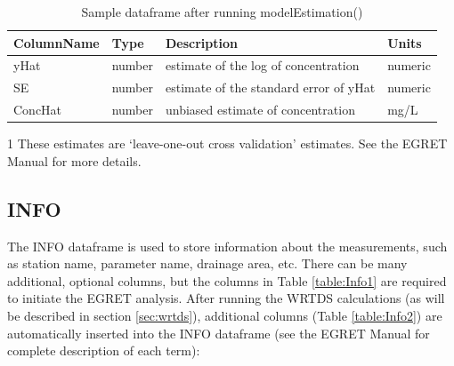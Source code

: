 \documentclass[a4paper,11pt]{article}\usepackage[]{graphicx}\usepackage[]{color}
\begin{document}
\begin{table}[!ht]
\centering
\begin{threeparttable}[b]
\caption{Sample dataframe after running modelEstimation()} 
\label{table:Sample2}
\begin{tabular}{llll}
  \hline
ColumnName & Type & Description & Units \\ 
  \hline
yHat\tnote{1} & number & estimate of the log of concentration & numeric \\ 
  SE\tnote{1} & number & estimate of the standard error of yHat & numeric \\ 
  ConcHat\tnote{1} & number & unbiased estimate of concentration & mg/L \\ 
   \hline
\end{tabular}

  \begin{tablenotes}
    \item[1] These estimates are `leave-one-out cross validation' estimates.  See the EGRET Manual for more details.
  \end{tablenotes}
 \end{threeparttable}
\end{table}



\FloatBarrier
\pagebreak


\subsection{INFO}
\label{sec:dataframesINFO}
The INFO dataframe is used to store information about the measurements, such as station name, parameter name, drainage area, etc. There can be many additional, optional columns, but the columns in Table \ref{table:Info1} are required to initiate the EGRET analysis. After running the WRTDS calculations (as will be described in section \ref{sec:wrtds}), additional columns (Table \ref{table:Info2}) are automatically inserted into the INFO dataframe (see the EGRET Manual for complete description of each term):
\end{document}
